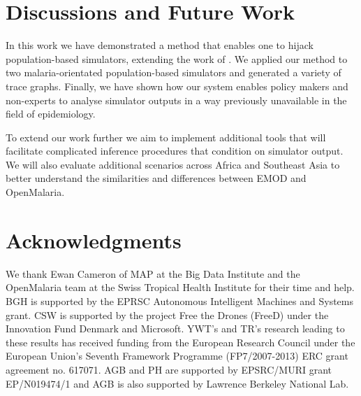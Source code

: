 \documentclass{article}
\begin{document}
\section{Discussions and Future Work}

In this work we have demonstrated a method 
that enables one to hijack population-based simulators, extending 
the work of \citet{baydin2018efficient}. 
We applied our method to two malaria-orientated population-based simulators and 
generated a variety of trace graphs.
Finally, we have shown how our system
enables policy makers and non-experts to analyse simulator outputs in a 
way previously unavailable in the field of epidemiology. 

To extend our work further we aim to implement additional 
tools that will facilitate complicated inference procedures that condition on simulator 
output. We will also evaluate additional scenarios across Africa and Southeast Asia to better understand the similarities and differences between EMOD and OpenMalaria.

\section{Acknowledgments}
We thank Ewan Cameron of MAP at the Big Data Institute and the OpenMalaria team at the Swiss Tropical Health Institute for their time and help. BGH is supported by the EPRSC Autonomous  Intelligent Machines and Systems grant. CSW  is supported by the project Free the Drones (FreeD) under the Innovation Fund Denmark and Microsoft. YWT's and TR's research leading to these results has received funding from the European Research Council under the European Union's Seventh Framework Programme (FP7/2007-2013) ERC grant agreement no. 617071. AGB and PH are supported by EPSRC/MURI grant EP/N019474/1 and AGB is also supported by Lawrence Berkeley National Lab.



\end{document}
